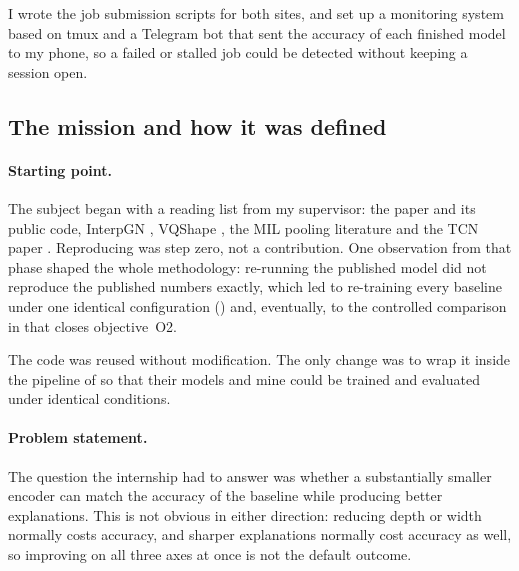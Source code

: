 \begin{contribution}
I wrote the job submission scripts for both sites, and set up a monitoring system based on tmux and
a Telegram bot that sent the accuracy of each finished model to my phone, so a failed or stalled job
could be detected without keeping a session open.
\end{contribution}

\subsection{The mission and how it was defined}
\label{app:mission}

\paragraph{Starting point.}
The subject began with a reading list from my supervisor: the \millet{} paper
\citep{early2024millet} and its public code, InterpGN \citep{wen2025interpgn}, VQShape
\citep{wen2024vqshape}, the MIL pooling literature \citep{ilse2018attention, li2021dsmil} and the TCN
paper \citep{bai2018tcn}. Reproducing \millet{} was step zero, not a contribution. One observation
from that phase shaped the whole methodology: re-running the published model did not reproduce the
published numbers exactly, which led to re-training every baseline under one identical configuration
() and, eventually, to the controlled comparison in 
that closes objective~O2.

\begin{priorwork}
The \millet{} code was reused without modification. The only change was to wrap it inside the
pipeline of  so that their models and mine could be trained and evaluated
under identical conditions.
\end{priorwork}

\paragraph{Problem statement.}
The question the internship had to answer was whether a substantially smaller encoder can match the
accuracy of the \millet{} baseline while producing better explanations. This is not obvious in
either direction: reducing depth or width normally costs accuracy, and sharper explanations normally
cost accuracy as well, so improving on all three axes at once is not the default outcome.

